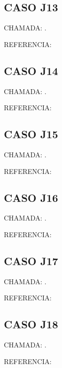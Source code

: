 \documentclass{undftex}
\begin{document}
\begin{refsection}\section*{CASO J13} CHAMADA: . \textcite{j13}\par REFERENCIA:\par\printbibliography[heading=none,check=undfconsultadas]\end{refsection}\clearpage
\begin{refsection}\section*{CASO J14} CHAMADA: . \textcite{j14}\par REFERENCIA:\par\printbibliography[heading=none,check=undfconsultadas]\end{refsection}\clearpage
\begin{refsection}\section*{CASO J15} CHAMADA: . \textcite{j15}\par REFERENCIA:\par\printbibliography[heading=none,check=undfconsultadas]\end{refsection}\clearpage
\begin{refsection}\section*{CASO J16} CHAMADA: . \textcite{j16}\par REFERENCIA:\par\printbibliography[heading=none,check=undfconsultadas]\end{refsection}\clearpage
\begin{refsection}\section*{CASO J17} CHAMADA: . \textcite{j17}\par REFERENCIA:\par\printbibliography[heading=none,check=undfconsultadas]\end{refsection}\clearpage
\begin{refsection}\section*{CASO J18} CHAMADA: . \textcite{j18}\par REFERENCIA:\par\printbibliography[heading=none,check=undfconsultadas]\end{refsection}\clearpage
\end{document}
